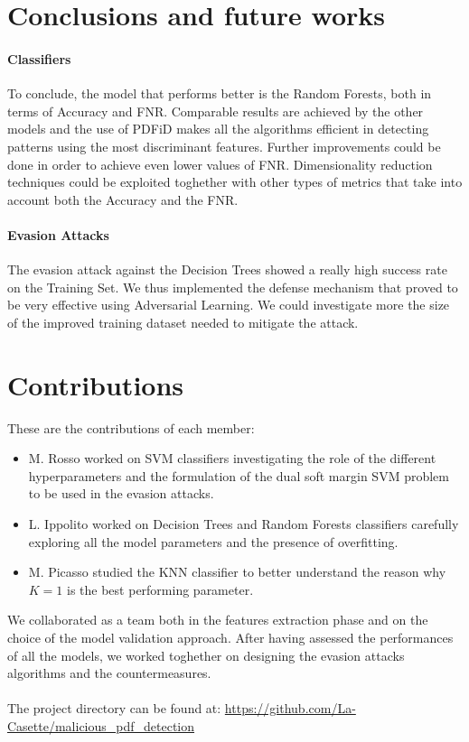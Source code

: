 \documentclass[twocolumn, switch]{article} %
\begin{document}
\section{Conclusions and future works}
\label{sec:conclusions}
\paragraph{Classifiers}
To conclude, the model that performs better is the Random Forests, both in terms of Accuracy and FNR. Comparable results are achieved by the other models and the use of PDFiD makes all the algorithms efficient in detecting patterns using the most discriminant features. Further improvements could be done in order to achieve even lower values of FNR. Dimensionality reduction techniques could be exploited toghether with other types of metrics that take into account both the Accuracy and the FNR.
\vspace{-10pt}
\paragraph{Evasion Attacks}
The evasion attack against the Decision Trees showed a really high success rate on the Training Set. We thus implemented the defense mechanism that proved to be very effective using Adversarial Learning. We could investigate more the size of the improved training dataset needed to mitigate the attack.

\section{Contributions}
\label{sec:contributions}
These are the contributions of each member:
\begin{itemize}
	\item M. Rosso worked on SVM classifiers investigating the role of the different hyperparameters and the formulation of the dual soft margin SVM problem to be used in the evasion attacks.
	\item L. Ippolito worked on Decision Trees and Random Forests classifiers carefully exploring all the model parameters and the presence of overfitting.
	\item M. Picasso studied the KNN classifier to better understand the reason why $K=1$ is the best performing parameter.
\end{itemize}
We collaborated as a team both in the features extraction phase and on the choice of the model validation approach. After having assessed the performances of all the models, we worked toghether on designing the evasion attacks algorithms and the countermeasures.
\\~\\
The project directory can be found at:\newline
\footnotesize{\url{https://github.com/La-Casette/malicious_pdf_detection}}
\end{document}
